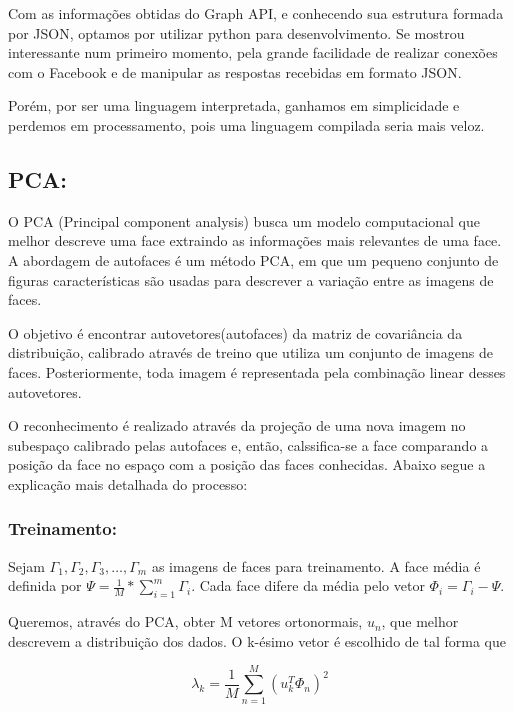 \documentclass[10pt,a4paper]{article}
\begin{document}
Com as informações obtidas do Graph API, e conhecendo sua estrutura formada por JSON, optamos por utilizar python para desenvolvimento. Se mostrou interessante num primeiro momento, pela grande facilidade de realizar conexões com o Facebook e de manipular as respostas recebidas em formato JSON.

Porém, por ser uma linguagem interpretada, ganhamos em simplicidade e perdemos em processamento, pois uma linguagem compilada seria mais veloz.


\subsection*{PCA:}

O PCA (Principal component analysis) busca um modelo computacional que
melhor descreve uma face extraindo as informações mais relevantes de
uma face. A abordagem de autofaces é um método PCA, em que um pequeno
conjunto de figuras características são usadas para descrever a
variação entre as imagens de faces.

O objetivo é encontrar autovetores(autofaces) da matriz de covariância
da distribuição, calibrado através de treino que utiliza um conjunto
de imagens de faces. Posteriormente, toda imagem é representada pela
combinação linear desses autovetores.

O reconhecimento é realizado através da projeção de uma nova imagem no
subespaço calibrado pelas autofaces e, então, calssifica-se a face
comparando a posição da face no espaço com a posição das faces conhecidas.
Abaixo segue a explicação mais detalhada do processo:

\subsubsection*{Treinamento:}

Sejam $\Gamma_1, \Gamma_2, \Gamma_3, \ldots, \Gamma_m$ as imagens de
faces para treinamento. A face média é definida por {$\Psi
  =\frac{1}{M}* \sum_{i=1}^m\Gamma_i$}. Cada face difere da média pelo vetor {$\Phi_i = \Gamma_i - \Psi$}.

Queremos, através do PCA, obter M vetores ortonormais, $u_n$, que
melhor descrevem a distribuição dos dados. O k-ésimo vetor é escolhido
de tal  forma que


\begin{equation}
  \lambda_{k}=\frac{1}{M}\sum_{n=1}^{M}(u_k^T\Phi_n)^2
\end{equation}
\end{document}
